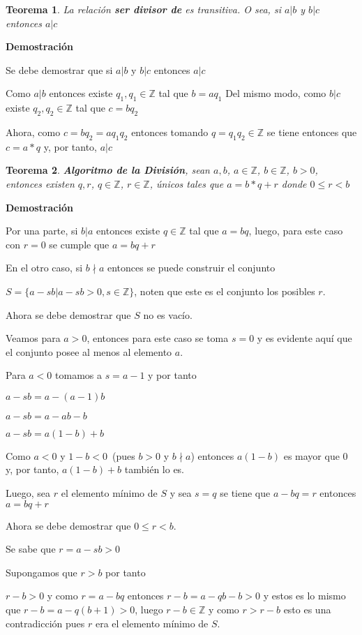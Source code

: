 \documentclass[a4paper,1pt]{report}
\newtheorem*{teo}{Teorema}
\begin{document}
\begin{teo}
 La relación \textbf{ser divisor de} es transitiva. O sea, si $a|b$ y $b|c$ entonces $a|c$
\end{teo}

\textbf{Demostración}

Se debe demostrar que si $a|b$ y $b|c$ entonces $a|c$

Como $a|b$ entonces existe $q_1, q_1\in\mathbb{Z}$ tal que $b=aq_1$
Del mismo modo, como $b|c$ existe $q_2, q_2\in\mathbb{Z}$ tal que $c=bq_2$

Ahora, como $c=bq_2=aq_1q_2$ entonces tomando $q=q_1q_2\in\mathbb{Z}$ se tiene entonces que $c=a*q$ y, por tanto, $a|c$ 

\begin{teo}
 \textbf{Algoritmo de la División}, sean $a,b$, $a\in\mathbb{Z}$, $b\in\mathbb{Z}$, $b > 0$, entonces existen $q,r$, $q\in\mathbb{Z}$, $r\in\mathbb{Z}$, únicos tales que $a = b*q+r$ donde $0\leq r < b$
\end{teo}

\textbf{Demostración}

Por una parte, si $b|a$ entonces existe $q\in\mathbb{Z}$ tal que $a=bq$, luego, para este caso con $r=0$ se cumple que $a=bq+r$

En el otro caso, si $b\nmid a$ entonces se puede construir el conjunto 

$S=\{a-sb|a-sb>0, s\in\mathbb{Z}\}$, noten que este es el conjunto los posibles $r$.

Ahora se debe demostrar que $S$ no es vacío.

Veamos para $a>0$, entonces para este caso se toma $s=0$ y es evidente aquí que el conjunto posee al menos al elemento $a$.

Para $a<0$ tomamos a $s=a-1$ y por tanto

$a-sb=a-(a-1)b$

$a-sb=a-ab-b$

$a-sb=a(1-b)+b$

Como $a<0$ y $1-b<0$~(pues $b>0$ y $b\nmid a$) entonces $a(1-b)$ es mayor que 0 y, por tanto, $a(1-b)+b$ también lo es.

Luego, sea $r$ el elemento mínimo de $S$ y sea $s=q$ se tiene que $a-bq=r$ entonces $a=bq+r$

Ahora se debe demostrar que $0\leq r < b$.

Se sabe que $r=a-sb>0$

Supongamos que $r>b$ por tanto

$r-b>0$ y como $r=a-bq$ entonces $r-b=a-qb-b>0$ y estos es lo mismo que $r-b=a-q(b+1)>0$, luego $r-b\in\mathbb{Z}$ y como $r>r-b$ esto es una contradicción pues $r$ era el elemento mínimo de $S$.
\end{document}
